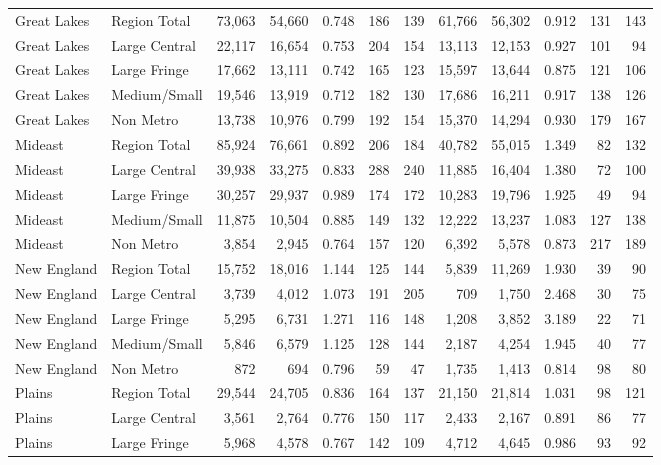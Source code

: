 \documentclass[
]{article}
\begin{document}
\begin{table}
\begin{tabular}[t]{llrrrrrrrrrr}
\addlinespace[5pt]
Great Lakes & Region Total & 73,063 & 54,660 & 0.748 & 186 & 139 & 61,766 & 56,302 & 0.912 & 131 & 143\\
\addlinespace[2pt]
Great Lakes & Large Central & 22,117 & 16,654 & 0.753 & 204 & 154 & 13,113 & 12,153 & 0.927 & 101 & 94\\
Great Lakes & Large Fringe & 17,662 & 13,111 & 0.742 & 165 & 123 & 15,597 & 13,644 & 0.875 & 121 & 106\\
Great Lakes & Medium/Small & 19,546 & 13,919 & 0.712 & 182 & 130 & 17,686 & 16,211 & 0.917 & 138 & 126\\
Great Lakes & Non Metro & 13,738 & 10,976 & 0.799 & 192 & 154 & 15,370 & 14,294 & 0.930 & 179 & 167\\
\addlinespace[5pt]
Mideast & Region Total & 85,924 & 76,661 & 0.892 & 206 & 184 & 40,782 & 55,015 & 1.349 & 82 & 132\\
\addlinespace[2pt]
Mideast & Large Central & 39,938 & 33,275 & 0.833 & 288 & 240 & 11,885 & 16,404 & 1.380 & 72 & 100\\
Mideast & Large Fringe & 30,257 & 29,937 & 0.989 & 174 & 172 & 10,283 & 19,796 & 1.925 & 49 & 94\\
Mideast & Medium/Small & 11,875 & 10,504 & 0.885 & 149 & 132 & 12,222 & 13,237 & 1.083 & 127 & 138\\
Mideast & Non Metro & 3,854 & 2,945 & 0.764 & 157 & 120 & 6,392 & 5,578 & 0.873 & 217 & 189\\
\addlinespace[5pt]
New England & Region Total & 15,752 & 18,016 & 1.144 & 125 & 144 & 5,839 & 11,269 & 1.930 & 39 & 90\\
\addlinespace[2pt]
New England & Large Central & 3,739 & 4,012 & 1.073 & 191 & 205 & 709 & 1,750 & 2.468 & 30 & 75\\
New England & Large Fringe & 5,295 & 6,731 & 1.271 & 116 & 148 & 1,208 & 3,852 & 3.189 & 22 & 71\\
New England & Medium/Small & 5,846 & 6,579 & 1.125 & 128 & 144 & 2,187 & 4,254 & 1.945 & 40 & 77\\
New England & Non Metro & 872 & 694 & 0.796 & 59 & 47 & 1,735 & 1,413 & 0.814 & 98 & 80\\
\addlinespace[5pt]
Plains & Region Total & 29,544 & 24,705 & 0.836 & 164 & 137 & 21,150 & 21,814 & 1.031 & 98 & 121\\
\addlinespace[2pt]
Plains & Large Central & 3,561 & 2,764 & 0.776 & 150 & 117 & 2,433 & 2,167 & 0.891 & 86 & 77\\
Plains & Large Fringe & 5,968 & 4,578 & 0.767 & 142 & 109 & 4,712 & 4,645 & 0.986 & 93 & 92\\

\end{tabular}
\end{table}
\end{document}
